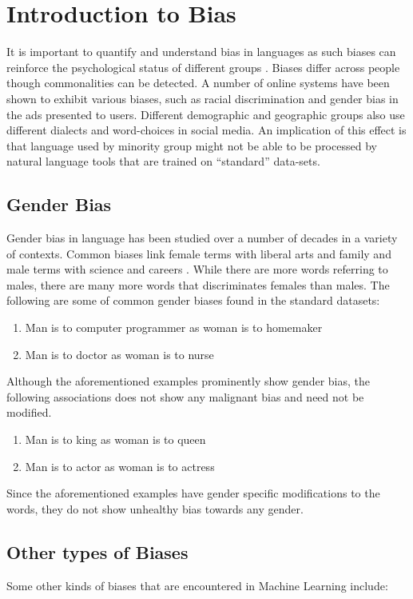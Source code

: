 \documentclass[12pt, a4paper]{article}
\begin{document}
	\section{Introduction to Bias}
		It is important to quantify and understand bias in languages as such biases can reinforce the psychological status of different groups \cite{4}. Biases differ across people though commonalities can be detected. A number of online systems have been shown to exhibit various biases, such as racial discrimination and gender bias in the ads presented to users. Different demographic and geographic groups also use different dialects and word-choices in social media. An implication of this effect is that language used by minority group might not be able to be processed by natural language tools that are trained on ``standard” data-sets.
		
		\subsection{Gender Bias}
			Gender bias in language has been studied over a number of decades in a variety of contexts. Common biases link female terms with liberal arts and family and male terms with science and careers \cite{3}. While there are more words referring to males, there are many more words that discriminates females than males. The following are some of common gender biases found in the standard datasets:
			\begin{enumerate}
				\item Man is to computer programmer as woman is to homemaker
				\item Man is to doctor as woman is to nurse
			\end{enumerate}
			
			Although the aforementioned examples prominently show gender bias, the following associations does not show any malignant bias and need not be modified.
			
			\begin{enumerate}
				\item Man is to king as woman is to queen
				\item Man is to actor as woman is to actress
			\end{enumerate}
			
			Since the aforementioned examples have gender specific modifications to the words, they do not show unhealthy bias towards any gender.
			
		\subsection{Other types of Biases}
			Some other kinds of biases\cite{2} that are encountered in Machine Learning include:
\end{document}
